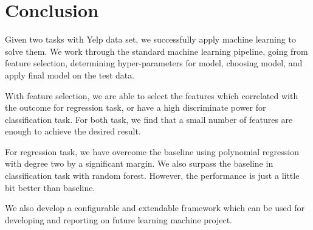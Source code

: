 \section{Conclusion}
\label{sec:five}

Given two tasks with Yelp data set, we successfully apply machine learning to solve them. We work through the standard machine learning pipeline, going from feature selection, determining hyper-parameters for model, choosing model, and apply final model on the test data.

With feature selection, we are able to select the features which correlated with the outcome for regression task, or have a high discriminate power for classification task. For both task, we find that a small number of features are enough to achieve the desired result.

For regression task, we have overcome the baseline using polynomial regression with degree two by a significant margin. We also surpass the baseline in classification task with random forest. However, the performance is just a little bit better than baseline.

We also develop a configurable and extendable framework which can be used for developing and reporting on future learning machine project.

